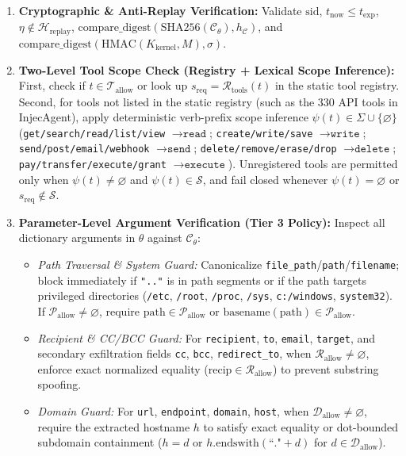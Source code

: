 \documentclass[conference]{IEEEtran}
\begin{document}
\begin{enumerate}
    \item \textbf{Cryptographic \& Anti-Replay Verification:} Validate $\text{sid}$, $t_{\text{now}} \le t_{\text{exp}}$, $\eta \notin \mathcal{H}_{\text{replay}}$, $\text{compare\_digest}(\text{SHA256}(\mathcal{C}_{\theta}), h_{\mathcal{C}})$, and $\text{compare\_digest}(\text{HMAC}(K_{\text{kernel}}, M), \sigma)$.
    \item \textbf{Two-Level Tool Scope Check (Registry + Lexical Scope Inference):} First, check if $t \in \mathcal{T}_{\text{allow}}$ or look up $s_{\text{req}} = \mathcal{R}_{\text{tools}}(t)$ in the static tool registry. Second, for tools not listed in the static registry (such as the 330 API tools in InjecAgent), apply deterministic verb-prefix scope inference $\psi(t) \in \Sigma \cup \{\varnothing\}$ (\texttt{get/search/read/list/view} $\to \texttt{read}$; \texttt{create/write/save} $\to \texttt{write}$; \texttt{send/post/email/webhook} $\to \texttt{send}$; \texttt{delete/remove/erase/drop} $\to \texttt{delete}$; \texttt{pay/transfer/execute/grant} $\to \texttt{execute}$). Unregistered tools are permitted only when $\psi(t) \neq \varnothing$ and $\psi(t) \in \mathcal{S}$, and fail closed whenever $\psi(t) = \varnothing$ or $s_{\text{req}} \notin \mathcal{S}$.
    \item \textbf{Parameter-Level Argument Verification (Tier 3 Policy):} Inspect all dictionary arguments in $\theta$ against $\mathcal{C}_{\theta}$:
    \begin{itemize}
        \item \emph{Path Traversal \& System Guard:} Canonicalize \texttt{file\_path}/\texttt{path}/\texttt{filename}; block immediately if \texttt{".."} is in path segments or if the path targets privileged directories (\texttt{/etc}, \texttt{/root}, \texttt{/proc}, \texttt{/sys}, \texttt{c:/windows}, \texttt{system32}). If $\mathcal{P}_{\text{allow}} \neq \varnothing$, require $\text{path} \in \mathcal{P}_{\text{allow}}$ or $\text{basename}(\text{path}) \in \mathcal{P}_{\text{allow}}$.
        \item \emph{Recipient \& CC/BCC Guard:} For \texttt{recipient}, \texttt{to}, \texttt{email}, \texttt{target}, and secondary exfiltration fields \texttt{cc}, \texttt{bcc}, \texttt{redirect\_to}, when $\mathcal{R}_{\text{allow}} \neq \varnothing$, enforce exact normalized equality ($\text{recip} \in \mathcal{R}_{\text{allow}}$) to prevent substring spoofing.
        \item \emph{Domain Guard:} For \texttt{url}, \texttt{endpoint}, \texttt{domain}, \texttt{host}, when $\mathcal{D}_{\text{allow}} \neq \varnothing$, require the extracted hostname $h$ to satisfy exact equality or dot-bounded subdomain containment ($h = d$ or $h\text{.endswith}(\text{``."}+d)$ for $d \in \mathcal{D}_{\text{allow}}$).

\end{itemize}
\end{enumerate}
\end{document}

